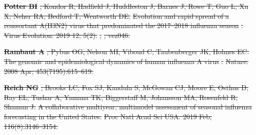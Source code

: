 \documentclass[9pt,lineno]{elife} %
\providecommand{\DIFdel}[1]{{\protect\color{red}\sout{#1}}}                      %
\providecommand{\DIFdeltex}[1]{{\protect\color{red}\sout{#1}}}                      %
\providecommand{\DIFdel}[1]{\texorpdfstring{\DIFdeltex{#1}}{}} %
\begin{document}
\textbf{%
\DIFdel{Potter BI}}%
\DIFdel{, Kondor R, Hadfield J, Huddleston J,
  Barnes J, Rowe T, Guo L, Xu X, Neher RA, Bedford T, Wentworth DE.
}%
\DIFdel{Evolution and rapid spread of a reassortant A(H3N2) virus that
  predominated the 2017–2018 influenza season}%
\DIFdel{.
}%
\DIFdel{Virus Evolution.  2019 12; 5(2).
}%
\DIFdel{,
  }%
\DIFdel{, vez046.
}%

\textbf{%
\DIFdel{Rambaut A}}%
\DIFdel{, Pybus OG, Nelson MI, Viboud C,
  Taubenberger JK, Holmes EC.
}%
\DIFdel{The genomic and epidemiological dynamics of human influenza A
  virus}%
\DIFdel{.
}%
\DIFdel{Nature.  2008 Apr; 453(7195):615--619.
}%

\textbf{%
\DIFdel{Reich NG}}%
\DIFdel{, Brooks LC, Fox SJ, Kandula S,
  McGowan CJ, Moore E, Osthus D, Ray EL, Tushar A, Yamana TK, Biggerstaff M,
  Johansson MA, Rosenfeld R, Shaman J.
}%
\DIFdel{A collaborative multiyear, multimodel assessment of seasonal
  influenza forecasting in the United States.}%
\DIFdel{Proc Natl Acad Sci USA.  2019 Feb; 116(8):3146--3154.
}%
\end{document}
